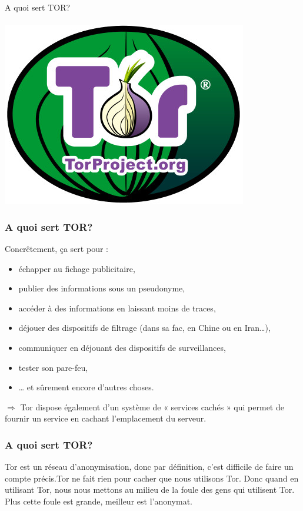 \documentclass{beamer}
\begin{document}
\begin{frame}
\begin{center}
\Huge{A quoi sert TOR?}
\\~\\ \includegraphics[scale=0.4]{./images/logo_tor.jpg}
\end{center}
\end{frame}
\begin{frame}
\frametitle{A quoi sert TOR?}
Concrêtement, ça sert pour :
\begin{itemize}
\item  échapper au fichage publicitaire,
\item  publier des informations sous un pseudonyme,
\item  accéder à des informations en laissant moins de traces,
\item  déjouer des dispositifs de filtrage (dans sa fac, en Chine ou en Iran…),
\item  communiquer en déjouant des dispositifs de surveillances,
\item  tester son pare-feu,
\item  … et sûrement encore d'autres choses.
\end{itemize}
$\Rightarrow$ Tor dispose également d'un système de « services cachés » qui permet de fournir un service en cachant l'emplacement du serveur.
\end{frame}
\begin{frame}
\frametitle{A quoi sert TOR?}
Tor est un réseau d'anonymisation, donc par définition, c'est difficile de faire un compte
précis.Tor ne fait rien pour cacher que nous utilisons Tor. Donc quand en utilisant
Tor, nous nous mettons au milieu de la foule des gens qui utilisent Tor. Plus
cette foule est grande, meilleur est l'anonymat.
\end{frame}
\end{document}
